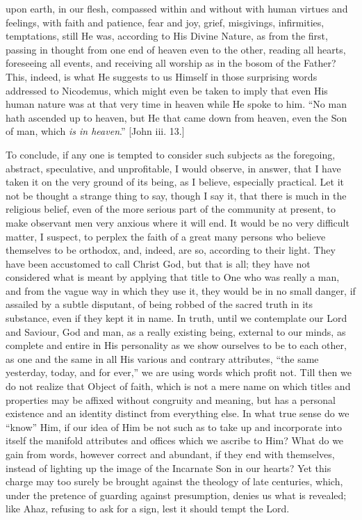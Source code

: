 upon earth, in our flesh, compassed within and without with human
virtues and feelings, with faith and patience, fear and joy, grief,
misgivings, infirmities, temptations, still He was, according to His
Divine Nature, as from the first, passing in thought from one end of
heaven even to the other, reading all hearts, foreseeing all events,
and receiving all worship as in the bosom of the Father? This, indeed,
is what He suggests to us Himself in those surprising words addressed
to Nicodemus, which might even be taken to imply that even His human
nature was at that very time in heaven while He spoke to him. ``No
man hath ascended up to heaven, but He that came down from heaven,
even the Son of man, which \emph{is in heaven}.'' [John iii. 13.]

To conclude, if any one is tempted to consider such subjects as the
foregoing, abstract, speculative, and unprofitable, I would observe,
in answer, that I have taken it on the very ground of its being, as I
believe, especially practical. Let it not be thought a strange thing
to say, though I say it, that there is much in the religious belief,
even of the more serious part of the community at present, to make
observant men very anxious where it will end. It would be no very
difficult matter, I suspect, to perplex the faith of a great many
persons who believe themselves to be orthodox, and, indeed, are so,
according to their light. They have been accustomed to call Christ
God, but that is all; they have not considered what is meant by
applying that title to One who was really a man, and from the vague
way in which they use it, they would be in no small danger, if
assailed by a subtle disputant, of being robbed of the sacred truth in
its substance, even if they kept it in name. In truth, until we
contemplate our Lord and Saviour, God and man, as a really existing
being, external to our minds, as complete and entire in His
personality as we show ourselves to be to each other, as one and the
same in all His various and contrary attributes, ``the same
yesterday, today, and for ever,'' we are using words which profit
not. Till then we do not realize that Object of faith, which is not a
mere name on which titles and properties may be affixed without
congruity and meaning, but has a personal existence and an identity
distinct from everything else. In what true sense do we
``know'' Him, if our idea of Him be not such as to take up and
incorporate into itself the manifold attributes and offices which we
ascribe to Him? What do we gain from words, however correct and
abundant, if they end with themselves, instead of lighting up the
image of the Incarnate Son in our hearts? Yet this charge may too
surely be brought against the theology of late centuries, which, under
the pretence of guarding against presumption, denies us what is
revealed; like Ahaz, refusing to ask for a sign, lest it should tempt
the Lord.

